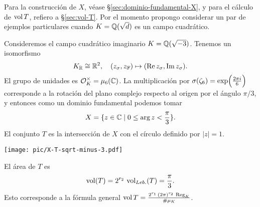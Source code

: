 Para la construcción de $X$, véase \S\ref{sec:dominio-fundamental-X}, y para el
cálculo de $\operatorname{vol} T$, refiero a \S\ref{sec:vol-T}. Por el momento propongo
considerar un par de ejemplos particulares cuando $K = \mathbb{Q} (\sqrt{d})$ es un
campo cuadrático.

\begin{ejemplo}
  \label{ejemplo:conjunto-X-Q(sqrt-3)}
  Consideremos el campo cuadrático imaginario $K = \mathbb{Q} (\sqrt{-3})$.
  Tenemos un isomorfismo
  \[ K_{\mathbb{R}} \cong \mathbb{R}^2, \quad
     (z_\sigma, z_{\overline{\sigma}}) \mapsto (\operatorname{Re} z_\sigma, \operatorname{Im} z_\sigma). \]
  El grupo de unidades es $\mathcal{O}_K^\times = \mu_6 (\mathbb{C})$. La multiplicación por
  $\sigma (\zeta_6) = \exp \Bigl(\frac{2\pi i}{6}\Bigr)$ corresponde a
  la rotación del plano complejo respecto al origen por el ángulo $\pi/3$,
  y entonces como un dominio fundamental podemos tomar
  $$X = \{ z \in \mathbb{C} \mid 0 \le \arg z < \frac{\pi}{3} \}.$$
  El conjunto $T$ es la intersección de $X$ con el círculo definido por
  $|z| = 1$.

  \begin{center}
    \texttt{[image: pic/X-T-sqrt-minus-3.pdf]}
  \end{center}

  El área de $T$ es
  $$\operatorname{vol} (T) = 2^{r_2}\,\operatorname{vol}_{Leb.} (T) = \frac{\pi}{3}.$$
  Esto corresponde a la fórmula general
  $\operatorname{vol} T = \frac{2^{r_1}\,(2\pi)^{r_2}\,\operatorname{Reg}_K}{\#\mu_K}$.
\end{ejemplo}

